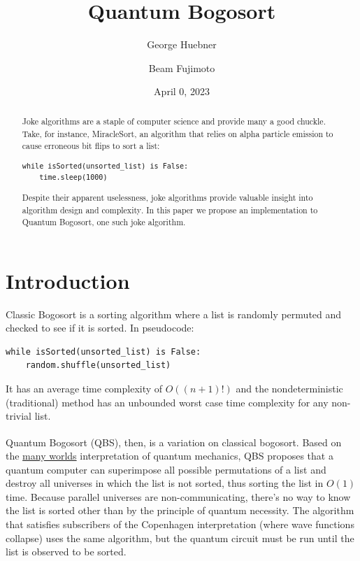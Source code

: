 \documentclass[12pt]{article}
\title{Quantum Bogosort}
\author[1]{George Huebner}
\affil[1]{University of Illinois at Urbana-Champaign}
\author[2]{Beam Fujimoto}
\affil[2]{Inter IKEA Holding B.V.}
\date{April 0, 2023}
\begin{document}
\renewcommand\refname{\centering \line(1,0){250}}
\renewcommand{\abstractname}{Abstract}

\maketitle

{
\hypersetup{hidelinks}
}

\begin{abstract}
\noindent Joke algorithms are a staple of computer science and provide many a good chuckle. Take, for instance, MiracleSort\textsuperscript{\cite{thompson_2013}}, an algorithm that relies on alpha particle emission to cause erroneous bit flips to sort a list:
\begin{verbatim}
while isSorted(unsorted_list) is False:
    time.sleep(1000)
\end{verbatim}
Despite their apparent uselessness, joke algorithms provide valuable insight into algorithm design and complexity\textsuperscript{\cite{gruber_holzer_ruepp_2007}}. In this paper we propose an implementation to Quantum Bogosort, one such joke algorithm.
\end{abstract}

\section{Introduction}

Classic Bogosort is a sorting algorithm where a list is randomly permuted and checked to see if it is sorted. In pseudocode:

\begin{verbatim}
while isSorted(unsorted_list) is False:
    random.shuffle(unsorted_list)
\end{verbatim}

\noindent It has an average time complexity of $O((n+1)!)$ and the nondeterministic (traditional) method has an unbounded worst case time complexity for any non-trivial list.

Quantum Bogosort\textsuperscript{\cite{the_other_tree_2009}} (QBS), then, is a variation on classical bogosort. Based on the \href{https://www.pbs.org/wgbh/nova/manyworlds/pdf/dissertation.pdf}{many worlds} interpretation of quantum mechanics, QBS proposes that a quantum computer can superimpose all possible permutations of a list and destroy all universes in which the list is not sorted, thus sorting the list in $ O(1) $ time. Because parallel universes are non-communicating, there's no way to know the list is sorted other than by the principle of quantum necessity. The algorithm that satisfies subscribers of the Copenhagen interpretation (where wave functions collapse) uses the same algorithm, but the quantum circuit must be run until the list is observed to be sorted.
\end{document}
